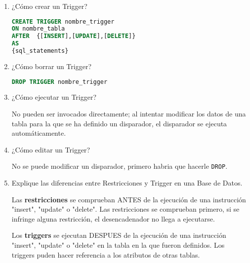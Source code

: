 \begin{enumerate}
\item ¿Cómo crear un Trigger?

\begin{lstlisting}[language=SQL]
CREATE TRIGGER nombre_trigger
ON nombre_tabla
AFTER  {[INSERT],[UPDATE],[DELETE]}
AS
{sql_statements}
\end{lstlisting}

\item ¿Cómo borrar un Trigger?

\begin{lstlisting}[language=SQL]
DROP TRIGGER nombre_trigger
\end{lstlisting}

\item ¿Cómo ejecutar un Trigger?

No pueden ser invocados directamente; al intentar modificar los datos de una tabla para la que se ha definido un disparador, el disparador se ejecuta automáticamente.


\item ¿Cómo editar un Trigger?

No se puede modificar un disparador, primero habria que hacerle \texttt{DROP}.

\item Explique las diferencias entre Restricciones y Trigger en una Base de Datos.

Las \textbf{restricciones} se comprueban ANTES de la ejecución de una instrucción "insert", "update" o "delete". 
Las restricciones se comprueban primero, si se infringe alguna restricción, el desencadenador no llega a ejecutarse.

Los \textbf{triggers} se ejecutan DESPUES de la ejecución de una instrucción "insert", "update" o "delete" en la tabla en la que fueron definidos.
Los triggers puden hacer referencia a los atributos de otras tablas.



\end{enumerate}
